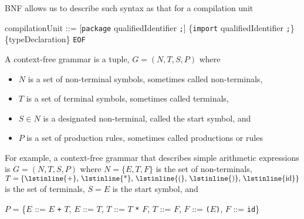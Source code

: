 \documentclass[8pt,a4paper,compress]{beamer}
\newcommand{\mm}[1]{$#1$}
\newenvironment{spaced}
{
\smallskip
\hspace{.5cm}
\begin{minipage}[c]{\textwidth}
}
{
\end{minipage}
\smallskip
}
\begin{document}
\begin{frame}[fragile]
\pause

BNF allows us to describe such syntax as that for a \jmm compilation unit

\text{ }
\begin{spaced}
\begin{production}
compilationUnit ::= [\lstinline{package} qualifiedIdentifier \lstinline{;}]
                           \{\lstinline{import}  qualifiedIdentifier \lstinline{;}\}
                           \{typeDeclaration\} \lstinline{EOF}
\end{production}
\end{spaced}

\pause
\bigskip

A context-free grammar is a tuple, $G = (N,T,S,P)$ where 
\begin{itemize}
\item $N$ is a set of non-terminal symbols, sometimes called non-terminals, 
\item $T$ is a set of terminal symbols, sometimes called terminals,
\item $S \in N$ is a designated non-terminal, called the start symbol, and
\item $P$ is a set of production rules, sometimes called productions or rules
\end{itemize}

\pause
\bigskip

For example, a context-free grammar that describes simple arithmetic expressions is $G = (N, T, S, P)$ where $N = \{E, T, F\}$ is the set of non-terminals, $T = \{\text{\lstinline{+}, \lstinline{*}, \lstinline{(}, \lstinline{)}, \lstinline{id}}\}$ is the set of terminals, $S = E$ is the start symbol, and

\text{ }
\begin{spaced}
\begin{production}
\mm{P} = \{\mm{E} ::= \mm{E} \lstinline{+} \mm{T},
        \mm{E} ::= \mm{T},
        \mm{T} ::= \mm{T} \lstinline{*} \mm{F},
        \mm{T} ::= \mm{F},
        \mm{F} ::= \lstinline{(}\mm{E}\lstinline{)},
        \mm{F} ::= \lstinline{id}\}
\end{production}
\end{spaced}
\end{frame}
\end{document}
